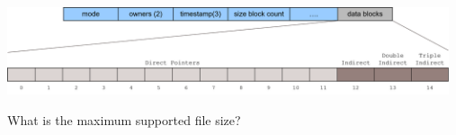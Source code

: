 \begin{slide}


    \includegraphics[width=130mm]{inode-struct-2.png}
    \bigskip

    What is the maximum supported file size?

\end{slide}

